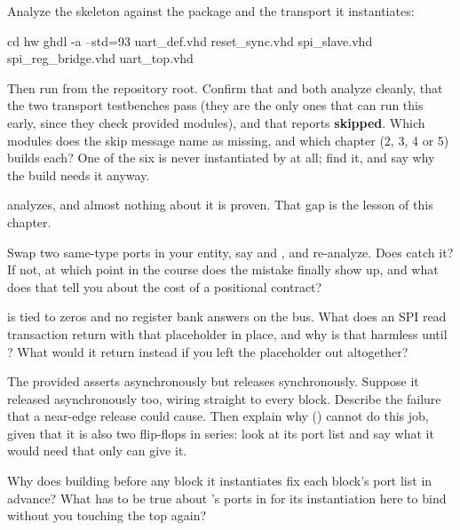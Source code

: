  Analyze the skeleton against the package and the transport it
instantiates:

\begin{shell}
cd hw
ghdl -a --std=93 uart_def.vhd reset_sync.vhd spi_slave.vhd spi_reg_bridge.vhd uart_top.vhd
\end{shell}

\noindent Then run  from the repository root. Confirm that  and
 both analyze cleanly, that the two transport testbenches pass (they are the only
ones that can run this early, since they check provided modules), and that 
reports \textbf{skipped}. Which modules does the skip message name as missing, and which chapter
(2, 3, 4 or 5) builds each? One of the six is never instantiated by  at all; find
it, and say why the build needs it anyway.

\label{c1:ex:3}
 analyzes, and almost nothing about it is proven. That gap is the lesson of this
chapter.

 Swap two same-type ports in your entity, say  and , and re-analyze.
Does  catch it? If not, at which point in the course does the mistake finally show up,
and what does that tell you about the cost of a positional contract?

  is tied to zeros and no register bank answers on the bus. What does an
SPI read transaction return with that placeholder in place, and why is that harmless until
? What would it return instead if you left the placeholder out altogether?

 The provided  asserts asynchronously but releases synchronously. Suppose
it released asynchronously too, wiring  straight to every block. Describe the failure
that a near-edge release could cause. Then explain why  () cannot do this job,
given that it is also two flip-flops in series: look at its port list and say what it would need
that only  can give it.

 Why does building  before any block it instantiates fix each block's port
list in advance? What has to be true about 's ports in  for its
instantiation here to bind without you touching the top again?
